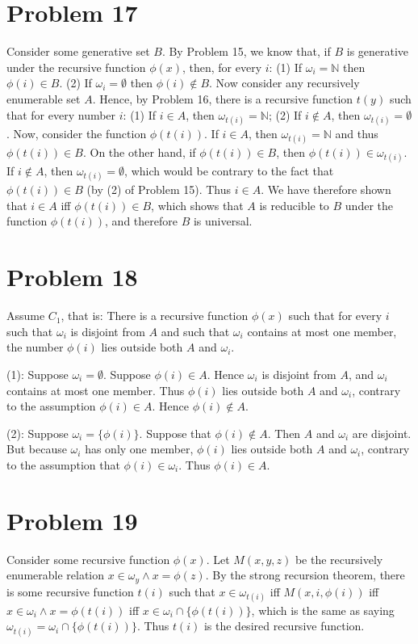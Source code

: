 \documentclass{article}
\newcommand{\N}{\mathbb{N}}
\theoremstyle{definition}
\begin{document}
\section*{Problem 17}
Consider some generative set $B$. By Problem 15, we know that, if $B$ is generative under the recursive function $\phi(x)$, then, for every $i$:\newline
(1) If $\omega_i=\N$ then $\phi(i)\in B$.\newline
(2) If $\omega_i=\emptyset$ then $\phi(i)\notin B$.\newline
Now consider any recursively enumerable set $A$. Hence, by Problem 16, there is a recursive function $t(y)$ such that for every number $i$:\newline
(1) If $i\in A$, then $\omega_{t(i)}=\N$;\newline
(2) If $i\notin A$, then $\omega_{t(i)}=\emptyset$.\newline
Now, consider the function $\phi(t(i))$. If $i\in A$, then $\omega_{t(i)}=\N$ and thus $\phi(t(i))\in B$. On the other hand, if $\phi(t(i))\in B$, then 
$\phi(t(i))\in\omega_{t(i)}$. If $i\notin A$, then $\omega_{t(i)}=\emptyset$, which would be contrary to the fact that $\phi(t(i))\in B$ (by (2) of Problem 15). Thus $i\in A$. We have therefore 
shown that $i\in A$ iff $\phi(t(i))\in B$, which shows that $A$ is reducible to $B$ under the function $\phi(t(i))$, and therefore $B$ is universal.

\section*{Problem 18}
Assume $C_1$, that is: There is a recursive function $\phi(x)$ such that for every $i$ such that $\omega_i$ is 
disjoint from $A$ and such that $\omega_i$ contains at most one member, the number $\phi(i)$ lies outside 
both $A$ and $\omega_i$.


(1): Suppose $\omega_i=\emptyset$. Suppose $\phi(i)\in A$. Hence $\omega_i$ is disjoint from $A$, and $\omega_i$ contains at most one member. Thus $\phi(i)$ lies outside both $A$ and 
$\omega_i$, contrary to the assumption $\phi(i)\in A$. Hence $\phi(i)\notin A$.


(2): Suppose $\omega_i=\{\phi(i)\}$. Suppose that $\phi(i)\notin A$. Then $A$ and $\omega_i$ are disjoint. But because $\omega_i$ has only one member, $\phi(i)$ lies outside both 
$A$ and $\omega_i$, contrary to the assumption that $\phi(i)\in\omega_i$. Thus $\phi(i)\in A$.

\section*{Problem 19}
Consider some recursive function $\phi(x)$. Let $M(x,y,z)$ be the recursively enumerable relation $x\in\omega_y\wedge x=\phi(z)$. By the strong recursion theorem, there is some recursive function 
$t(i)$ such that $x\in\omega_{t(i)}$ iff $M(x,i,\phi(i))$ iff $x\in\omega_i\wedge x=\phi(t(i))$ iff $x\in\omega_i\cap\{\phi(t(i))\}$, which is the same as saying 
$\omega_{t(i)}=\omega_i\cap\{\phi(t(i))\}$. Thus $t(i)$ is the desired recursive function. 
\end{document}
